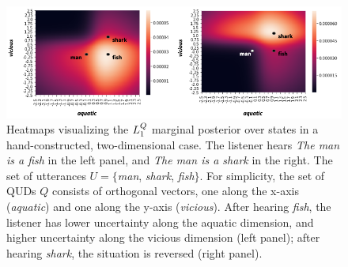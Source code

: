 \documentclass[9pt,twocolumn,twoside,lineno]{pnas-new}
\newcommand{\Listener}{L}
\newcommand{\QLONE}{\Listener_{{1}}^{{Q}}}
\begin{document}
	\begin{figure}

	\centering

	\includegraphics[width=\textwidth]{images/bothheatmaps.png}








	\caption{Heatmaps visualizing the $\protect\QLONE$ marginal posterior over states in a hand-constructed, two-dimensional case. The listener hears \emph{The man is a fish} in the left panel, and \emph{The man is a shark} in the right. The set of utterances $U = \{$\emph{man}, \emph{shark}, \emph{fish}$\}$. For simplicity, the set of QUDs $Q$ consists of orthogonal vectors, one along the x-axis (\emph{aquatic}) and one along the y-axis (\emph{vicious}). After hearing \emph{fish}, the listener has lower uncertainty along the aquatic dimension, and higher uncertainty along the vicious dimension (left panel); after hearing \emph{shark}, the situation is reversed (right panel).} 


	\label{l1heatmaps}

	\end{figure}
 
\end{document}
